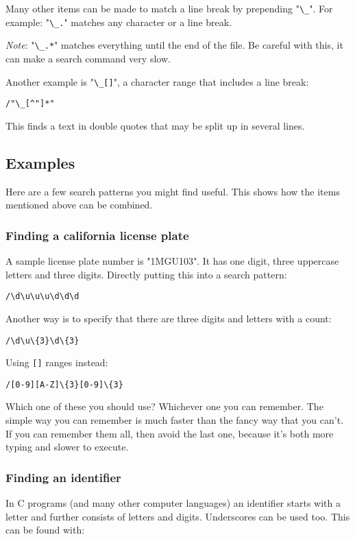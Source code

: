 Many other items can be made to match a line break by prepending "\verb!\_!".
For example: "\verb!\_.!" matches any character or a line break.

\emph{Note}: "\verb!\_.*!" matches everything until the end of the file.
Be careful with this, it can make a search command very slow.

Another example is "\verb!\_[]!", a character range that includes a line break:

\begin{Verbatim}[samepage=true]
 /"\_[^"]*"
\end{Verbatim}

This finds a text in double quotes that may be split up in several lines.
\subsection{Examples}
Here are a few search patterns you might find useful.
This shows how the items mentioned above can be combined.

\subsubsection{Finding a california license plate}
A sample license plate number is "1MGU103".
It has one digit, three uppercase letters and three digits.
Directly putting this into a search pattern:

\begin{Verbatim}[samepage=true]
 /\d\u\u\u\d\d\d
\end{Verbatim}

Another way is to specify that there are three digits and letters with a count:

\begin{Verbatim}[samepage=true]
 /\d\u\{3}\d\{3}
\end{Verbatim}

Using \verb![]! ranges instead:

\begin{Verbatim}[samepage=true]
 /[0-9][A-Z]\{3}[0-9]\{3}
\end{Verbatim}

Which one of these you should use?  Whichever one you can remember.
The simple way you can remember is much faster than the fancy way that you can't.
If you can remember them all, then avoid the last one, because it's both more typing and slower to execute.

\subsubsection{Finding an identifier}
In C programs (and many other computer languages) an identifier starts with a letter and further consists of letters and digits.
Underscores can be used too.
This can be found with:

